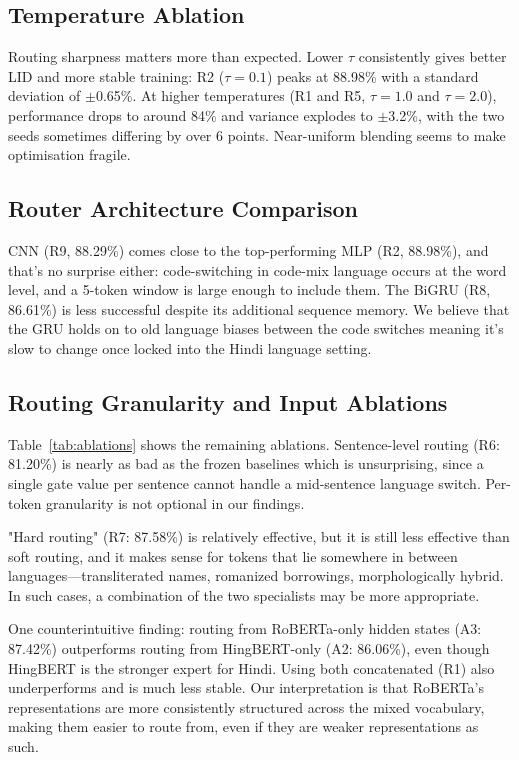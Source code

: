 \documentclass[conference]{IEEEtran}
\begin{document}
\subsection{Temperature Ablation}

Routing sharpness matters more than expected. Lower $\tau$ consistently gives better LID and more stable training: R2 ($\tau{=}0.1$) peaks at 88.98\% with a standard deviation of $\pm$0.65\%. At higher temperatures (R1 and R5, $\tau{=}1.0$ and $\tau{=}2.0$), performance drops to around 84\% and variance explodes to $\pm$3.2\%, with the two seeds sometimes differing by over 6 points. Near-uniform blending seems to make optimisation fragile.

\subsection{Router Architecture Comparison}

CNN (R9, 88.29\%) comes close to the top-performing MLP (R2, 88.98\%), and that's no surprise either: code-switching in code-mix language occurs at the word level, and a 5-token window is large enough to include them. The BiGRU (R8, 86.61\%) is less successful despite its additional sequence memory. We believe that the GRU holds on to old language biases between the code switches meaning it's slow to change once locked into the Hindi language setting.

\subsection{Routing Granularity and Input Ablations}

Table~\ref{tab:ablations} shows the remaining ablations. Sentence-level routing (R6: 81.20\%) is nearly as bad as the frozen baselines which is unsurprising, since a single gate value per sentence cannot handle a mid-sentence language switch. Per-token granularity is not optional in our findings.

"Hard routing" (R7: 87.58\%) is relatively effective, but it is still less effective than soft routing, and it makes sense for tokens that lie somewhere in between languages—transliterated names, romanized borrowings, morphologically hybrid. In such cases, a combination of the two specialists may be more appropriate.

One counterintuitive finding: routing from RoBERTa-only hidden states (A3: 87.42\%) outperforms routing from HingBERT-only (A2: 86.06\%), even though HingBERT is the stronger expert for Hindi. Using both concatenated (R1) also underperforms and is much less stable. Our interpretation is that RoBERTa's representations are more consistently structured across the mixed vocabulary, making them easier to route from, even if they are weaker representations as such.
\end{document}
